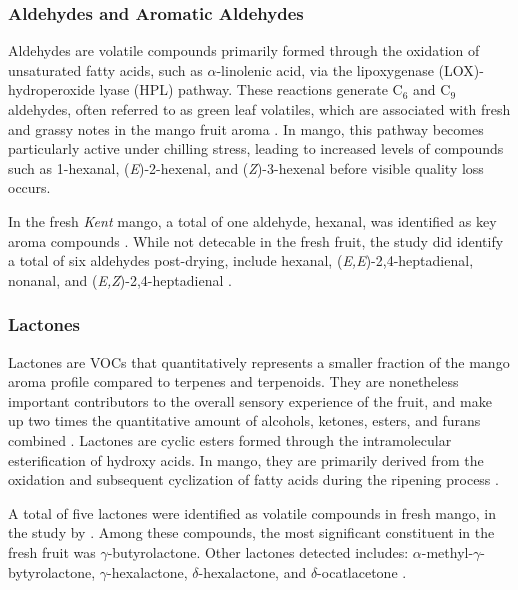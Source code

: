 \subsubsection{Aldehydes and Aromatic Aldehydes}
Aldehydes are volatile compounds primarily formed through the oxidation of unsaturated fatty acids, such as $\alpha$-linolenic acid, via the lipoxygenase (LOX)-hydroperoxide lyase (HPL) pathway. These reactions generate C$_6$ and C$_9$ aldehydes, often referred to as green leaf volatiles, which are associated with fresh and grassy notes in the mango fruit aroma \cite*{A11_Sivankalyani2017}. In mango, this pathway becomes particularly active under chilling stress, leading to increased levels of compounds such as 1-hexanal, (\textit{E})-2-hexenal, and (\textit{Z})-3-hexenal before visible quality loss occurs.

\vspace{1em}
In the fresh \textit{Kent} mango, a total of one aldehyde, hexanal, was identified as key aroma compounds \cite*{A07_Bonneau2016}. While not detecable in the fresh fruit, the study did identify a total of six aldehydes post-drying, include hexanal, (\textit{E,E})-2,4-heptadienal, nonanal, and (\textit{E,Z})-2,4-heptadienal \cite*{A07_Bonneau2016}.

\subsubsection{Lactones}
Lactones are VOCs that quantitatively represents a smaller fraction of the mango aroma profile compared to terpenes and terpenoids. They are nonetheless important contributors to the overall sensory experience of the fruit, and make up two times the quantitative amount of alcohols, ketones, esters, and furans combined \cite*{A14_Silva2021, A07_Bonneau2016}. Lactones are cyclic esters formed through the intramolecular esterification of hydroxy acids. In mango, they are primarily derived from the oxidation and subsequent cyclization of fatty acids during the ripening process \cite*{A13_ElHadi2013}.

\vspace{1em}
A total of five lactones were identified as volatile compounds in fresh mango, in the study by \textcite*{A07_Bonneau2016}. Among these compounds, the most significant constituent in the fresh fruit was $\gamma$-butyrolactone. Other lactones detected includes: $\alpha$-methyl-$\gamma$-bytyrolactone, $\gamma$-hexalactone, $\delta$-hexalactone, and $\delta$-ocatlacetone \cite*{A07_Bonneau2016}.

